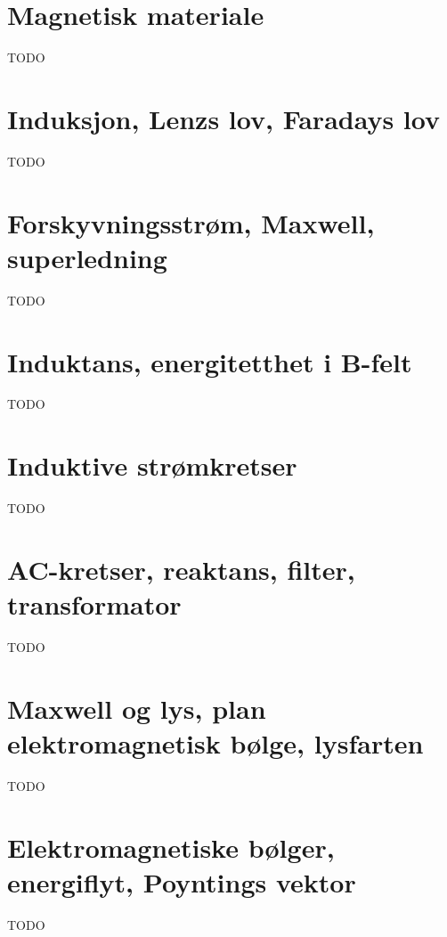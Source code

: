 \documentclass{article}
\begin{document}
  \section{Magnetisk materiale}
    TODO
  \section{Induksjon, Lenzs lov, Faradays lov}
    TODO
  \section{Forskyvningsstrøm, Maxwell, superledning}
    TODO
  \section{Induktans, energitetthet i B-felt}
    TODO
  \section{Induktive strømkretser}
    TODO
  \section{AC-kretser, reaktans, filter, transformator}
    TODO
  \section{Maxwell og lys, plan elektromagnetisk bølge, lysfarten}
    TODO
  \section{Elektromagnetiske bølger, energiflyt, Poyntings vektor}
    TODO
\end{document}

